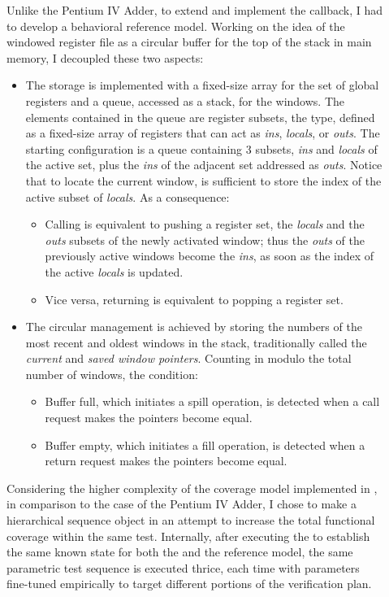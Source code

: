 \begin{description}
    \item[] Unlike the Pentium IV Adder, to extend  and implement the  callback, I had to develop a behavioral reference model. Working on the idea of the windowed register file as a circular buffer for the top of the stack in main memory, I decoupled these two aspects:
    \begin{itemize}
        \item The storage is implemented with a fixed-size array for the set of global registers and a \sv queue, accessed as a stack, for the windows. The elements contained in the queue are register subsets, the  type, defined as a fixed-size array of registers that can act as \emph{ins}, \emph{locals}, or \emph{outs}. The starting configuration is a queue containing 3 subsets, \emph{ins} and \emph{locals} of the active set, plus the \emph{ins} of the adjacent set addressed as \emph{outs}. Notice that to locate the current window, is sufficient to store the index of the active subset of \emph{locals}. As a consequence:
        \begin{itemize}
            \item Calling is equivalent to pushing a register set, the \emph{locals} and the \emph{outs} subsets of the newly activated window; thus the \emph{outs} of the previously active windows become the \emph{ins}, as soon as the index of the active \emph{locals} is updated.
            \item Vice versa, returning is equivalent to popping a register set.
        \end{itemize}

        \item The circular management is achieved by storing the numbers of the most recent and oldest windows in the stack, traditionally called the \emph{current} and \emph{saved window pointers}. Counting in modulo the total number of windows, the condition:
        \begin{itemize}
            \item Buffer full, which initiates a spill operation, is detected when a call request makes the pointers become equal.
            \item Buffer empty, which initiates a fill operation, is detected when a return request makes the pointers become equal.
        \end{itemize}
    \end{itemize}
    \item[] Considering the higher complexity of the coverage model implemented in , in comparison to the case of the Pentium IV Adder, I chose to make  a hierarchical sequence object in an attempt to increase the total functional coverage within the same test. Internally, after executing the  to establish the same known state for both the \dut and the reference model, the same parametric test sequence  is executed thrice, each time with parameters fine-tuned empirically to target different portions of the verification plan.
    

\end{description}
